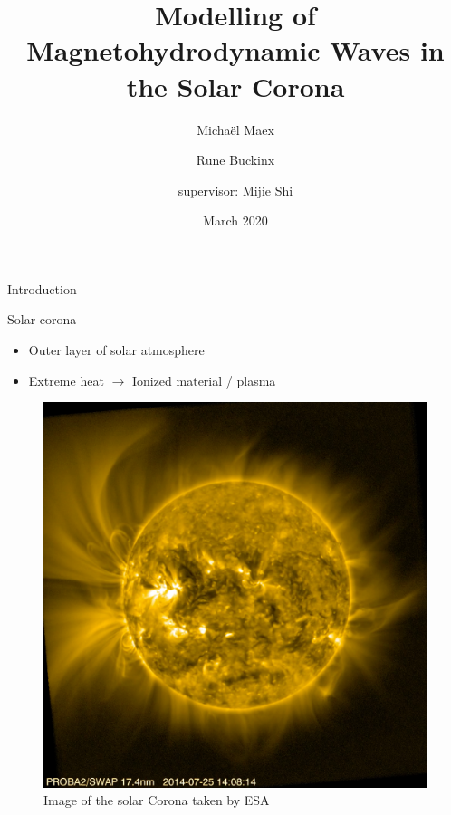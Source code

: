 \documentclass{beamer}
\title[]{Modelling of Magnetohydrodynamic Waves in the Solar Corona}
\author{\phantom{=/}  Micha\"el Maex \and Rune Buckinx \and supervisor: Mijie Shi }
\date{March 2020}
\begin{document}
\maketitle
\begin{frame}{Introduction} %
	\begin{minipage}{.54\linewidth}
    	Solar corona
	\begin{itemize}
	    \item Outer layer of solar atmosphere
	    \item Extreme heat $\longrightarrow$ Ionized material / plasma
	\end{itemize}
\end{minipage}
\hspace{.04\linewidth}
\begin{minipage}{.39\linewidth}
    \begin{figure}
        \centering
        \includegraphics[width=\textwidth]{figures/imagesolarco.png}
        \caption{Image of the solar Corona taken by ESA}
        \label{fig:my_label}
    \end{figure}
\end{minipage}
\end{frame}
\end{document}
